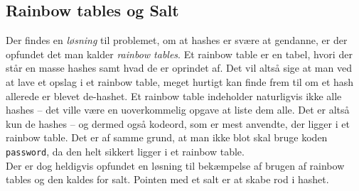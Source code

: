     \subsection{Rainbow tables og Salt}
    Der findes en \textit{løsning} til problemet, om at hashes er svære at gendanne, er der opfundet det man kalder \emph{rainbow tables}.
    Et rainbow table er en tabel, hvori der står en masse hashes samt hvad de er oprindet af.
    Det vil altså sige at man ved at lave et opslag i et rainbow table, meget hurtigt kan finde frem til om et hash allerede er blevet de-hashet.
    Et rainbow table indeholder naturligvis ikke alle hashes -- det ville være en uoverkommelig opgave at liste dem alle.
    Det er altså kun de hashes -- og dermed også kodeord, som er mest anvendte, der ligger i et rainbow table.
    Det er af samme grund, at man ikke blot skal bruge koden \texttt{password}, da den helt sikkert ligger i et rainbow table.
    \\

    Der er dog heldigvis opfundet en løsning til bekæmpelse af brugen af rainbow tables og den kaldes for salt.
    Pointen med et salt er at skabe rod i hashet.



